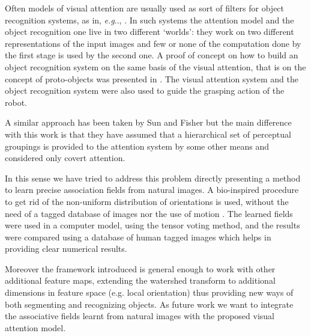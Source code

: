 \documentclass{llncs}
\makeatletter
\DeclareRobustCommand\onedot{\futurelet\@let@token\@onedot}
\def\@onedot{\ifx\@let@token.\else.\null\fi\xspace}
\def\eg{\emph{e.g}\onedot} \def\Eg{\emph{E.g}\onedot}
\makeatother
\begin{document}
Often models of visual attention are usually used as
sort of filters for object recognition systems, as in, \eg, \cite{WaltherK06}.
In such systems the attention model and the object recognition one
live in two different `worlds': they work on two
different representations of the input images and few or none
of the computation done by the first stage is used by the
second one. A proof of concept on how to build an object
recognition system on the same basis of the visual attention,
that is on the concept of proto-objects was presented in
\cite{Orabona07}. The visual attention system and the object recognition
system were also used to guide the grasping action of the robot.

A similar approach has been taken by Sun and
Fisher \cite{SunF03} but the main difference with this work is that
they have assumed that a hierarchical set of perceptual
groupings is provided to the attention system by some
other means and considered only covert attention.

In this sense we have tried to address this problem directly presenting a method to learn
precise association fields from natural images. A bio-inspired procedure
to get rid of the non-uniform distribution of orientations
is used, without the need of a tagged database of images \cite{ElderG02} nor
the use of motion \cite{Prodohl01}.
The learned fields were used in a computer model, using the tensor voting method,
and the results were compared using a database of human tagged images which helps
in providing clear numerical results.

Moreover the framework introduced is general enough
to work with other additional feature maps, extending the
watershed transform to additional dimensions in feature
space (e.g. local orientation) thus providing new ways
of both segmenting and recognizing objects.
As future work we want to integrate the associative fields
learnt from natural images with the proposed visual attention
model.








\end{document}
